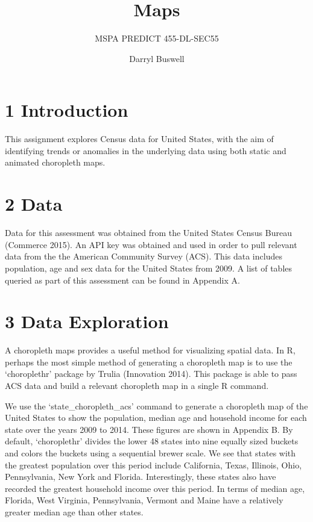 \documentclass[]{article}
\title{Maps}
\subtitle{MSPA PREDICT 455-DL-SEC55}
\author{Darryl Buswell}
\date{}
\begin{document}
\maketitle

\newpage

\section{1 Introduction}\label{introduction}

This assignment explores Census data for United States, with the aim of
identifying trends or anomalies in the underlying data using both static
and animated choropleth maps.

\section{2 Data}\label{data}

Data for this assessment was obtained from the United States Census
Bureau (Commerce 2015). An API key was obtained and used in order to
pull relevant data from the the American Community Survey (ACS). This
data includes population, age and sex data for the United States from
2009. A list of tables queried as part of this assessment can be found
in Appendix A.

\section{3 Data Exploration}\label{data-exploration}

A choropleth maps provides a useful method for visualizing spatial data.
In R, perhaps the most simple method of generating a choropleth map is
to use the `choroplethr' package by Trulia (Innovation 2014). This
package is able to pass ACS data and build a relevant choropleth map in
a single R command.

We use the `state\_choropleth\_acs' command to generate a choropleth map
of the United States to show the population, median age and household
income for each state over the years 2009 to 2014. These figures are
shown in Appendix B. By default, `choroplethr' divides the lower 48
states into nine equally sized buckets and colors the buckets using a
sequential brewer scale. We see that states with the greatest population
over this period include California, Texas, Illinois, Ohio,
Pennsylvania, New York and Florida. Interestingly, these states also
have recorded the greatest household income over this period. In terms
of median age, Florida, West Virginia, Pennsylvania, Vermont and Maine
have a relatively greater median age than other states.
\end{document}
